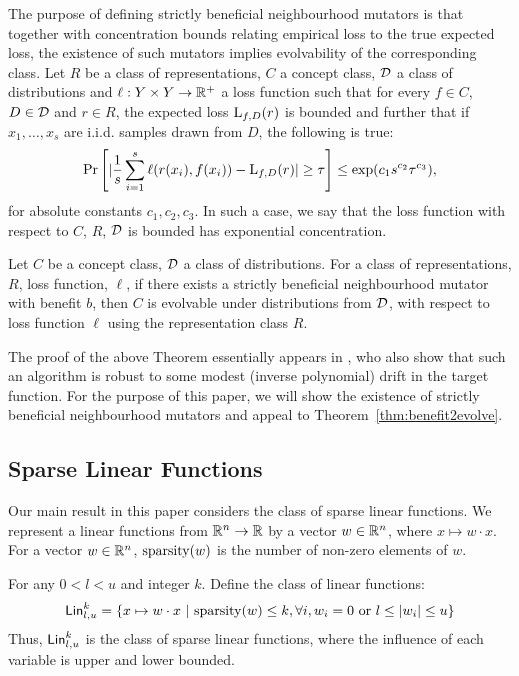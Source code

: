 The purpose of defining strictly beneficial neighbourhood mutators is that
together with concentration bounds relating empirical loss to the true expected
loss, the existence of such mutators implies evolvability of the corresponding
class. Let $R$ be a class of representations, $C$ a concept class, ${\mathcal D}$ a
class of distributions and $\ell : Y \times Y \rightarrow \mathbb{R}^+$ a loss
function such that for every $f \in C$, $D \in {\mathcal D}$ and $r \in R$, the
expected loss $\mathrm{L}_{f, D}(r)$ is bounded and further that if $x_1, \ldots,
x_s$ are i.i.d. samples drawn from $D$, the following is true:
%
\[ \Pr\left[ |\frac{1}{s} \sum_{i=1}^s \ell(r(x_i), f(x_i)) - \mathrm{L}_{f, D}(r)|
\geq \tau \right] \leq \exp(c_1 s^{c_2} \tau^{c_3}), \]
%
for absolute constants $c_1, c_2, c_3$. In such a case, we say that the loss
function with respect to $C$, $R$, ${\mathcal D}$ is bounded has exponential
concentration. 

\begin{theorem} \label{thm:benefit2evolve}
Let $C$ be a concept class, ${\mathcal D}$ a class of distributions. For a class of
representations, $R$, loss function, $\ell$, if there exists a strictly
beneficial neighbourhood mutator with benefit $b$, then $C$ is evolvable under
distributions from ${\mathcal D}$, with respect to loss function $\ell$ using the
representation class $R$.  \end{theorem}

The proof of the above Theorem essentially appears in \cite{KVV:2010}, who also
show that such an algorithm is robust to some modest (inverse polynomial) drift
in the target function. For the purpose of this paper, we will show the
existence of strictly beneficial neighbourhood mutators and appeal to
Theorem~\ref{thm:benefit2evolve}.

\subsection{Sparse Linear Functions} 

Our main result in this paper considers the class of sparse linear functions.
We represent a linear functions from $\mathbb{R}^n \rightarrow \mathbb{R}$ by a vector
$w \in \mathbb{R}^n$, where $x \mapsto w \cdot x$.  For a vector $w \in \mathbb{R}^n$,
$\mathrm{sparsity}(w)$ is the number of non-zero elements of $w$. 

For any $0 < l < u$ and integer $k$. Define the class of linear functions:
\[
\mathsf{Lin}^k_{l, u} = \{ x \mapsto w \cdot x ~|~ \mathrm{sparsity}(w) \leq k, \forall i,
w_i = 0 \mbox{ or } l \leq |w_i| \leq u \}
\]
Thus, $\mathsf{Lin}^k_{l, u}$ is the class of sparse linear functions, where the influence
of each variable is upper and lower bounded.

